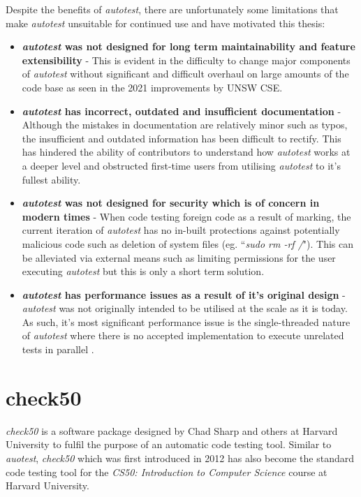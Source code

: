 \documentclass[hidelinks]{report}
\begin{document}
Despite the benefits of \textit{autotest}, there are unfortunately some limitations that make \textit{autotest} unsuitable for continued use and have motivated this thesis:
\begin{itemize}
	\item \textbf{\textit{autotest} was not designed for long term maintainability and feature extensibility} - This is evident in the difficulty to change major components of \textit{autotest} without significant and difficult overhaul on large amounts of the code base as seen in the 2021 improvements by UNSW CSE.
	\item \textbf{\textit{autotest} has incorrect, outdated and insufficient documentation} - Although the mistakes in documentation are relatively minor such as typos, the insufficient and outdated information has been difficult to rectify. This has hindered the ability of contributors to understand how \textit{autotest} works at a deeper level and obstructed first-time users from utilising \textit{autotest} to it's fullest ability.
	\item \textbf{\textit{autotest} was not designed for security which is of concern in modern times} - When code testing foreign code as a result of marking, the current iteration of \textit{autotest} has no in-built protections against potentially malicious code such as deletion of system files (eg. ``\textit{sudo rm -rf /}"). This can be alleviated via external means such as limiting permissions for the user executing \textit{autotest} but this is only a short term solution.
	\item \textbf{\textit{autotest} has performance issues as a result of it's original design} - \textit{autotest} was not originally intended to be utilised at the scale as it is today. As such, it's most significant performance issue is the single-threaded nature of \textit{autotest} where there is no accepted implementation to execute unrelated tests in parallel \cite{AutotestParallelisation}.
\end{itemize}

\section{check50}

\textit{check50} is a software package designed by Chad Sharp and others at Harvard University to fulfil the purpose of an automatic code testing tool. Similar to \textit{auotest}, \textit{check50} which was first introduced in 2012 has also become the standard code testing tool for the \textit{CS50: Introduction to Computer Science} course at Harvard University.
\end{document}
